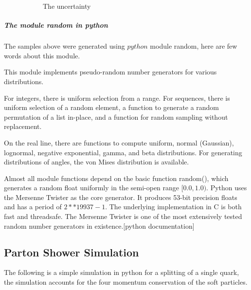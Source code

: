 \documentclass[12pt,a4paper]{article}
\begin{document}
\begin{figure}
\begin{subfigure}[b]{0.45\textwidth}
        \caption{The uncertainty}
        \label{fig2}
    \end{subfigure}
    \label{Fig:1}
\caption{}
\end{figure}

\subparagraph{The module random in python}

The samples above were generated using $python$ module random, here are few words about this module.
 
This module implements pseudo-random number generators for various distributions.

For integers, there is uniform selection from a range. For sequences, there is uniform selection of a random element, a function to generate a random permutation of a list in-place, and a function for random sampling without replacement.

On the real line, there are functions to compute uniform, normal (Gaussian), lognormal, negative exponential, gamma, and beta distributions. For generating distributions of angles, the von Mises distribution is available.

Almost all module functions depend on the basic function random(), which generates a random float uniformly in the semi-open range $[0.0, 1.0)$. Python uses the Mersenne Twister as the core generator. It produces 53-bit precision floats and has a period of $2**19937-1$. The underlying implementation in C is both fast and threadsafe. The Mersenne Twister is one of the most extensively tested random number generators in existence.[python documentation]
\subsection{Parton Shower Simulation}
The following is a simple simulation in python for a splitting of a single quark, the simulation accounts for the four momentum conservation of the soft particles.    
\end{document}
